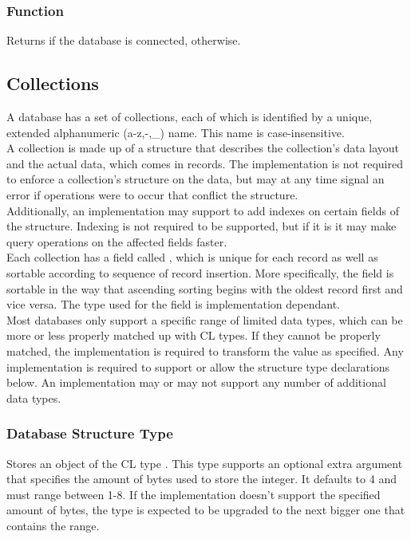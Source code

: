 \subsubsection{Function }
Returns  if the database is connected,  otherwise.

\subsection{Collections}
A database has a set of collections, each of which is identified by a unique, extended alphanumeric (a-z,-,\_) name. This name is case-insensitive. \\

A collection is made up of a structure that describes the collection's data layout and the actual data, which comes in records. The implementation is not required to enforce a collection's structure on the data, but may at any time signal an error if operations were to occur that conflict the structure. \\

Additionally, an implementation may support to add indexes on certain fields of the structure. Indexing is not required to be supported, but if it is it may make query operations on the affected fields faster. \\

Each collection has a field called , which is unique for each record as well as sortable according to sequence of record insertion. More specifically, the  field is sortable in the way that ascending sorting begins with the oldest record first and vice versa. The type used for the field is implementation dependant. \\

Most databases only support a specific range of limited data types, which can be more or less properly matched up with CL types. If they cannot be properly matched, the implementation is required to transform the value as specified. Any implementation is required to support or allow the structure type declarations below. An implementation may or may not support any number of additional data types. 

\subsubsection{Database Structure Type }
Stores an object of the CL type . This type supports an optional extra argument that specifies the amount of bytes used to store the integer. It defaults to 4 and must range between 1-8. If the implementation doesn't support the specified amount of bytes, the type is expected to be upgraded to the next bigger one that contains the range.


